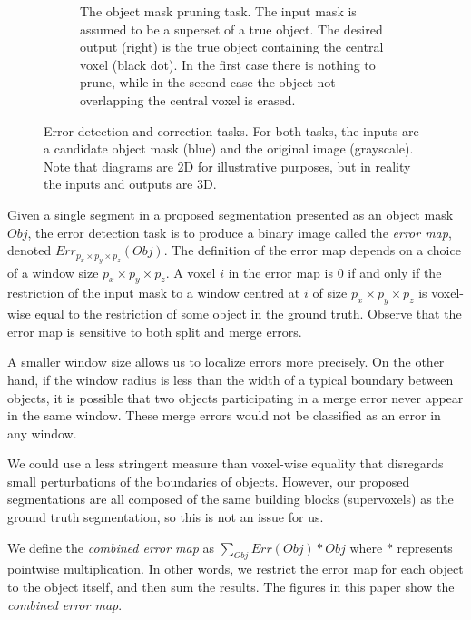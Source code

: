 \documentclass{article}
\begin{document}
\begin{figure}[t!]
\begin{center}
\begin{subfigure}[t]{0.45\textwidth}
	\caption{The object mask pruning task. The input mask is assumed to be a superset of a true object. The desired output (right) is the true object containing the central voxel (black dot). In the first case there is nothing to prune, while in the second case the object not overlapping the central voxel is erased.}
	\label{fig:error_correction_cartoon}
\end{subfigure}
        \end{center}
        \caption{Error detection and correction tasks.  For both tasks, the inputs are a candidate object mask (blue) and the original image (grayscale). Note that diagrams are 2D for illustrative purposes, but in reality the inputs and outputs are 3D.}
\end{figure}
Given a single segment in a proposed segmentation presented as an object mask $Obj$, the error detection task is to produce a binary image called the \textit{error map}, denoted $Err_{p_x\times p_y \times p_z}(Obj)$. The definition of the error map depends on a choice of a window size $p_x \times p_y \times p_z$. A voxel $i$ in the error map is 0 if and only if the restriction of the input mask to a window centred at $i$ of size $p_x \times p_y \times p_z$ is voxel-wise equal to the restriction of some object in the ground truth. Observe that the error map is sensitive to both split and merge errors.

A smaller window size allows us to localize errors more precisely. On the other hand, if the window radius is less than the width of a typical boundary between objects, it is possible that two objects participating in a merge error never appear in the same window. These merge errors would not be classified as an error in any window.

We could use a less stringent measure than voxel-wise equality that disregards small perturbations of the boundaries of objects. However, our proposed segmentations are all composed of the same building blocks (supervoxels) as the ground truth segmentation, so this is not an issue for us.

We define the \textit{combined error map} as $\sum_{Obj} Err(Obj) * Obj$ where $*$ represents pointwise multiplication. In other words, we restrict the error map for each object to the object itself, and then sum the results. The figures in this paper show the \textit{combined error map}.
\end{document}
